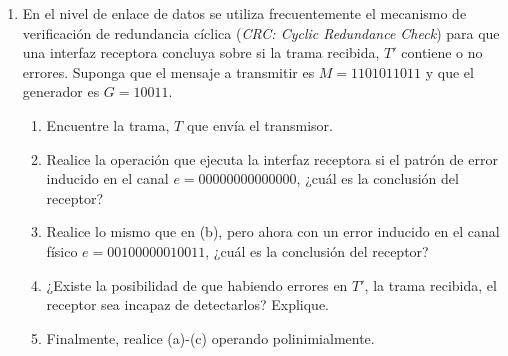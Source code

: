 \begin{enumerate}
    \item En el nivel de enlace de datos se utiliza frecuentemente el mecanismo de verificaci\'on de redundancia c\'iclica 
    (\textit{CRC: Cyclic Redundance Check}) para que una interfaz receptora concluya sobre si la trama recibida, \(T'\) contiene
    o no errores. Suponga que el mensaje a transmitir es \(M=1101011011\) y que el generador es \(G=10011\).
    \begin{enumerate}
        \item Encuentre la trama, \(T\) que env\'ia el transmisor.
        \item Realice la operaci\'on que ejecuta la interfaz receptora si el patr\'on de error inducido en el canal
        \(e=00000000000000\), ¿cu\'al es la conclusi\'on del receptor?
        \item Realice lo mismo que en (b), pero ahora con un error inducido en el canal f\'isico \(e=00100000010011\), 
        ¿cu\'al es la conclusi\'on del receptor?
        \item ¿Existe la posibilidad de que habiendo errores en \(T'\), la trama recibida, el receptor sea incapaz de detectarlos?
        Explique.
        \item Finalmente, realice (a)-(c) operando polinimialmente.
    \end{enumerate}
\end{enumerate}